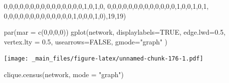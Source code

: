 \documentclass[
  notitlepage,
  onecolumn,
  openany]{book}
\newenvironment{Shaded}{\begin{snugshade}}{\end{snugshade}}
\newcommand{\AttributeTok}[1]{\textcolor[rgb]{0.77,0.63,0.00}{#1}}
\newcommand{\ConstantTok}[1]{\textcolor[rgb]{0.00,0.00,0.00}{#1}}
\newcommand{\DecValTok}[1]{\textcolor[rgb]{0.00,0.00,0.81}{#1}}
\newcommand{\FloatTok}[1]{\textcolor[rgb]{0.00,0.00,0.81}{#1}}
\newcommand{\FunctionTok}[1]{\textcolor[rgb]{0.00,0.00,0.00}{#1}}
\newcommand{\NormalTok}[1]{#1}
\newcommand{\StringTok}[1]{\textcolor[rgb]{0.31,0.60,0.02}{#1}}
\begin{document}
\begin{Shaded}
\begin{Highlighting}[]
  \DecValTok{0}\NormalTok{,}\DecValTok{0}\NormalTok{,}\DecValTok{0}\NormalTok{,}\DecValTok{0}\NormalTok{,}\DecValTok{0}\NormalTok{,}\DecValTok{0}\NormalTok{,}\DecValTok{0}\NormalTok{,}\DecValTok{0}\NormalTok{,}\DecValTok{0}\NormalTok{,}\DecValTok{0}\NormalTok{,}\DecValTok{0}\NormalTok{,}\DecValTok{0}\NormalTok{,}\DecValTok{0}\NormalTok{,}\DecValTok{0}\NormalTok{,}\DecValTok{0}\NormalTok{,}\DecValTok{1}\NormalTok{,}\DecValTok{0}\NormalTok{,}\DecValTok{1}\NormalTok{,}\DecValTok{0}\NormalTok{,}
  \DecValTok{0}\NormalTok{,}\DecValTok{0}\NormalTok{,}\DecValTok{0}\NormalTok{,}\DecValTok{0}\NormalTok{,}\DecValTok{0}\NormalTok{,}\DecValTok{0}\NormalTok{,}\DecValTok{0}\NormalTok{,}\DecValTok{0}\NormalTok{,}\DecValTok{0}\NormalTok{,}\DecValTok{0}\NormalTok{,}\DecValTok{0}\NormalTok{,}\DecValTok{0}\NormalTok{,}\DecValTok{0}\NormalTok{,}\DecValTok{1}\NormalTok{,}\DecValTok{0}\NormalTok{,}\DecValTok{0}\NormalTok{,}\DecValTok{1}\NormalTok{,}\DecValTok{0}\NormalTok{,}\DecValTok{1}\NormalTok{,}
  \DecValTok{0}\NormalTok{,}\DecValTok{0}\NormalTok{,}\DecValTok{0}\NormalTok{,}\DecValTok{0}\NormalTok{,}\DecValTok{0}\NormalTok{,}\DecValTok{0}\NormalTok{,}\DecValTok{0}\NormalTok{,}\DecValTok{0}\NormalTok{,}\DecValTok{0}\NormalTok{,}\DecValTok{0}\NormalTok{,}\DecValTok{0}\NormalTok{,}\DecValTok{0}\NormalTok{,}\DecValTok{0}\NormalTok{,}\DecValTok{1}\NormalTok{,}\DecValTok{0}\NormalTok{,}\DecValTok{0}\NormalTok{,}\DecValTok{0}\NormalTok{,}\DecValTok{1}\NormalTok{,}\DecValTok{0}\NormalTok{),}\DecValTok{19}\NormalTok{,}\DecValTok{19}\NormalTok{)}

\FunctionTok{par}\NormalTok{(}\AttributeTok{mar =} \FunctionTok{c}\NormalTok{(}\DecValTok{0}\NormalTok{,}\DecValTok{0}\NormalTok{,}\DecValTok{0}\NormalTok{,}\DecValTok{0}\NormalTok{))}
\FunctionTok{gplot}\NormalTok{(network,}
      \AttributeTok{displaylabels=}\ConstantTok{TRUE}\NormalTok{,}
      \AttributeTok{edge.lwd=}\FloatTok{0.5}\NormalTok{,}
      \AttributeTok{vertex.lty =} \FloatTok{0.5}\NormalTok{,}
      \AttributeTok{usearrows=}\ConstantTok{FALSE}\NormalTok{, }
      \AttributeTok{gmode=}\StringTok{"graph"}
\NormalTok{)}
\end{Highlighting}
\end{Shaded}

\texttt{[image: \_main\_files/figure-latex/unnamed-chunk-176-1.pdf]}

\begin{Shaded}
\begin{Highlighting}[]
\FunctionTok{clique.census}\NormalTok{(network, }\AttributeTok{mode =} \StringTok{"graph"}\NormalTok{)}
\end{Highlighting}
\end{Shaded}
\end{document}
